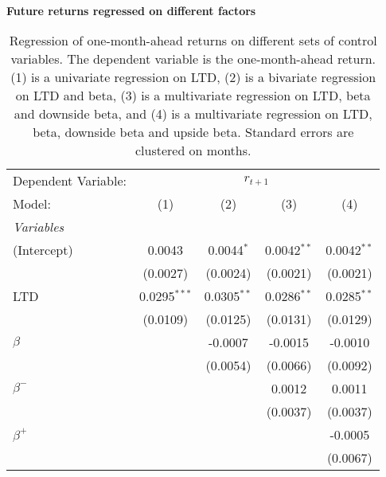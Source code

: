 \begin{table}[H]
\caption{\\ \large{\textbf{Future returns regressed on different factors}}}
\captionsetup{justification = justified, width = \linewidth}
\caption*{Regression of one-month-ahead returns on different
                               sets of control variables. The dependent variable is
                               the one-month-ahead return. (1) is a univariate regression
                               on LTD, (2) is a bivariate regression on LTD and beta,
                               (3) is a multivariate regression on LTD, beta and downside 
                               beta, and (4) is a multivariate regression on LTD, beta,
                               downside beta and upside beta. Standard errors are clustered
                               on months.}
   \centering
\label{reg_clustered_on_time_1}
   \begin{tabular}{lcccc}
      \tabularnewline \midrule \midrule
      Dependent Variable: & \multicolumn{4}{c}{$r_{t+1}$}\\
      Model:         & (1)            & (2)           & (3)           & (4)\\  
      \midrule
      \emph{Variables}\\
      (Intercept)    & 0.0043         & 0.0044$^{*}$  & 0.0042$^{**}$ & 0.0042$^{**}$\\   
                     & (0.0027)       & (0.0024)      & (0.0021)      & (0.0021)\\   
      LTD            & 0.0295$^{***}$ & 0.0305$^{**}$ & 0.0286$^{**}$ & 0.0285$^{**}$\\   
                     & (0.0109)       & (0.0125)      & (0.0131)      & (0.0129)\\   
      $\beta$        &                & -0.0007       & -0.0015       & -0.0010\\   
                     &                & (0.0054)      & (0.0066)      & (0.0092)\\   
      $\beta^{-}$    &                &               & 0.0012        & 0.0011\\   
                     &                &               & (0.0037)      & (0.0037)\\   
      $\beta^{+}$    &                &               &               & -0.0005\\   
                     &                &               &               & (0.0067)\\   
      \midrule

\end{tabular}
\end{table}
